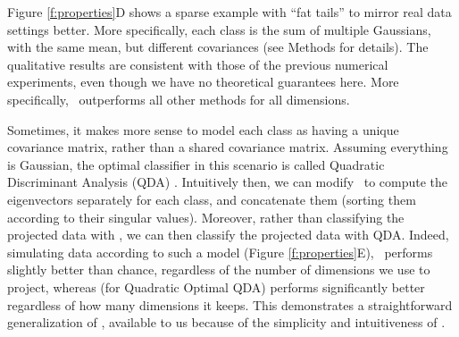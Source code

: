 \documentclass[10pt]{article}
\begin{document}
 Figure \ref{f:properties}{\color{magenta}D} shows a sparse example with ``fat tails'' to mirror real data settings better. More specifically, each class is the sum of multiple Gaussians, with the same mean, but different covariances (see Methods for details). The qualitative results are consistent with those of the previous numerical experiments, even though  we have no theoretical guarantees here. More specifically, \Lol~outperforms all other methods for all dimensions.


 Sometimes, it makes more sense to model each class as having a unique covariance matrix, rather than a shared covariance matrix.  Assuming everything is Gaussian, the optimal classifier in this scenario is called  Quadratic Discriminant Analysis (QDA) \cite{Hastie2004}.  Intuitively then, we can modify \Lol~to compute the eigenvectors separately for each class, and concatenate them (sorting them according to their singular values).  Moreover, rather than classifying the projected data with \Lda, we can then classify the projected data with QDA.  Indeed, simulating data according to such a model (Figure \ref{f:properties}E), \Lol~performs slightly better than chance, regardless of the number of dimensions we use to project, whereas  (for Quadratic Optimal QDA) performs significantly better regardless of how many dimensions it keeps. This demonstrates a  straightforward generalization of \Lol, available to us because of the simplicity and intuitiveness of \Lol.

\end{document}
